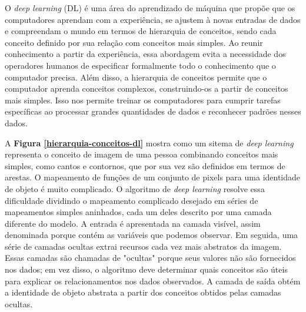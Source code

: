  O \textit{deep learning} (DL) é uma área do aprendizado de máquina que propõe que os computadores aprendam com a experiência, se ajustem à novas entradas de dados e compreendam o mundo em termos de hierarquia de conceitos, sendo cada conceito definido por sua relação com conceitos mais simples. 
 Ao reunir conhecimento a partir da experiência, essa abordagem evita a necessidade dos operadores humanos de especificar formalmente todo o conhecimento que o computador precisa. Além disso, a hierarquia de conceitos permite que o computador aprenda conceitos complexos, construindo-os a partir de conceitos mais simples. Isso nos permite treinar os computadores para cumprir tarefas específicas ao processar grandes quantidades de dados e reconhecer padrões nesses dados.

 A \textbf{Figura \ref{hierarquia-conceitos-dl}} mostra como um sitema de \textit{deep learning} representa o conceito de imagem de uma pessoa combinando conceitos mais simples, como cantos e contornos, que por sua vez são definidos em termos de arestas. 
 O mapeamento de funções de um conjunto de pixels para uma identidade de objeto é muito complicado. O algoritmo de \textit{deep learning} resolve essa dificuldade dividindo o mapeamento complicado desejado em séries de mapeamentos simples aninhados, cada um deles descrito por uma camada diferente do modelo. A entrada é apresentada na camada visível, assim denominada porque contém as variáveis que podemos observar.
 Em seguida, uma série de camadas ocultas extrai recursos cada vez mais abstratos da imagem. Essas camadas são chamadas de "ocultas" porque seus valores não são fornecidos nos dados; em vez disso, o algoritmo deve determinar quais conceitos são úteis para explicar os relacionamentos nos dados observados. A camada de saída obtém a identidade de objeto abstrata a partir dos conceitos obtidos pelas camadas ocultas.


